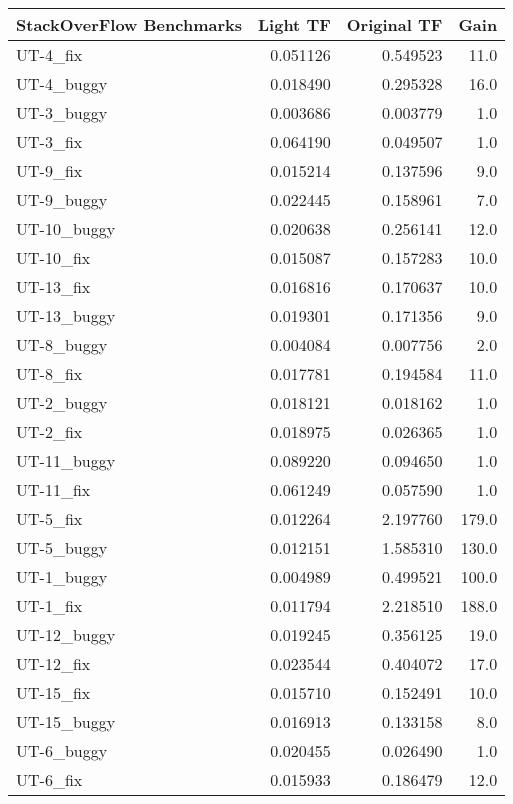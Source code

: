 \documentclass[14pt]{article}
\begin{document}
\begin{tabular}{lrrr}
\toprule
StackOverFlow Benchmarks &  Light TF &  Original TF &   Gain \\
\midrule
 UT-4\_fix    &  0.051126 &     0.549523 &   11.0 \\
 UT-4\_buggy  &  0.018490 &     0.295328 &   16.0 \\
 UT-3\_buggy  &  0.003686 &     0.003779 &    1.0 \\
 UT-3\_fix    &  0.064190 &     0.049507 &    1.0 \\
 UT-9\_fix    &  0.015214 &     0.137596 &    9.0 \\
 UT-9\_buggy  &  0.022445 &     0.158961 &    7.0 \\
 UT-10\_buggy &  0.020638 &     0.256141 &   12.0 \\
 UT-10\_fix   &  0.015087 &     0.157283 &   10.0 \\
 UT-13\_fix   &  0.016816 &     0.170637 &   10.0 \\
 UT-13\_buggy &  0.019301 &     0.171356 &    9.0 \\
 UT-8\_buggy  &  0.004084 &     0.007756 &    2.0 \\
 UT-8\_fix    &  0.017781 &     0.194584 &   11.0 \\
 UT-2\_buggy  &  0.018121 &     0.018162 &    1.0 \\
 UT-2\_fix    &  0.018975 &     0.026365 &    1.0 \\
 UT-11\_buggy &  0.089220 &     0.094650 &    1.0 \\
 UT-11\_fix   &  0.061249 &     0.057590 &    1.0 \\
 UT-5\_fix    &  0.012264 &     2.197760 &  179.0 \\
 UT-5\_buggy  &  0.012151 &     1.585310 &  130.0 \\
 UT-1\_buggy  &  0.004989 &     0.499521 &  100.0 \\
 UT-1\_fix    &  0.011794 &     2.218510 &  188.0 \\
 UT-12\_buggy &  0.019245 &     0.356125 &   19.0 \\
 UT-12\_fix   &  0.023544 &     0.404072 &   17.0 \\
 UT-15\_fix   &  0.015710 &     0.152491 &   10.0 \\
 UT-15\_buggy &  0.016913 &     0.133158 &    8.0 \\
 UT-6\_buggy  &  0.020455 &     0.026490 &    1.0 \\
 UT-6\_fix    &  0.015933 &     0.186479 &   12.0 \\
\bottomrule
\end{tabular}
\end{document}
